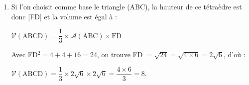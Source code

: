 \begin{enumerate}
\begin{enumerate}
$\vect{\text{FD}}\cdot \vect{\text{AC}} = - 6 + 2 + 4 = 0$.

Le vecteur $\vect{\text{FD}}$ est donc orthogonal à deux vecteurs non colinéaires du plan (ABC) : il est donc orthogonal à ce plan, ou encore la droite (FD) est orthogonale au plan (ABC).
		\item %
Si l'on choisit comme base le triangle (ABC), la hauteur de ce tétraèdre est donc [FD] et la volume est égal à :

$\mathcal{V}(\text{ABCD}) = \dfrac13 \times \mathcal{A}(\text{ABC}) \times \text{FD}$

Avec FD$^2 = 4 + 4 + 16 = 24$, on trouve FD $ = \sqrt{24} = \sqrt{4 \times 6} = 2\sqrt{6}$, d'où :

$\mathcal{V}(\text{ABCD}) = \dfrac13 \times 2 \sqrt{6} \times 2\sqrt{6} = \dfrac{4 \times 6}{3} = 8$.
	\end{enumerate}
\end{enumerate}

\bigskip

